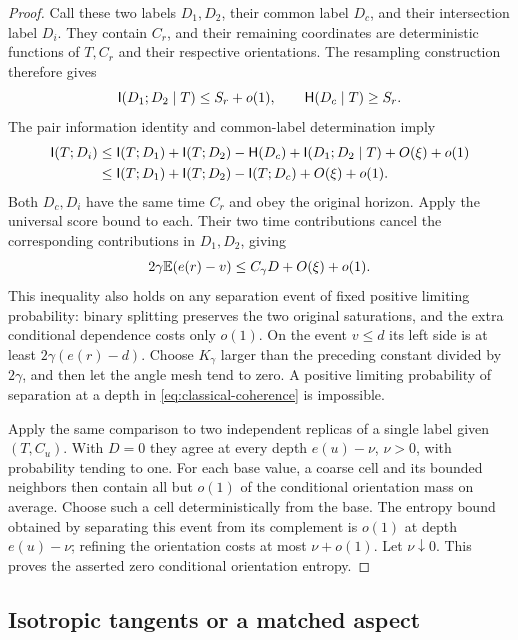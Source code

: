 \begin{proof}
Call these two labels $D_1,D_2$, their common label $D_c$, and their
intersection label $D_i$.  They contain $C_r$, and their remaining
coordinates are deterministic functions of $T,C_r$ and their respective
orientations.  The resampling construction therefore gives
\[
 \mathsf I(D_1;D_2\mid T)\le S_r+o(1),\qquad
 \mathsf H(D_c\mid T)\ge S_r.
\]
The pair information identity and common-label determination imply
\begin{align*}
 \mathsf I(T;D_i)
 &\le\mathsf I(T;D_1)+\mathsf I(T;D_2)-\mathsf H(D_c)
                   +\mathsf I(D_1;D_2\mid T)+O(\xi)+o(1)\\
 &\le\mathsf I(T;D_1)+\mathsf I(T;D_2)-\mathsf I(T;D_c)+O(\xi)+o(1).
\end{align*}
Both $D_c,D_i$ have the same time $C_r$ and obey the original horizon.
Apply the universal score bound to each.  Their two time contributions
cancel the corresponding contributions in $D_1,D_2$, giving
\[
 2\gamma\mathbb E(e(r)-v)\le C_\gamma D+O(\xi)+o(1).
\]
This inequality also holds on any separation event of fixed positive
limiting probability: binary splitting preserves the two original
saturations, and the extra conditional dependence costs only $o(1)$.
On the event $v\le d$ its left side is at least
$2\gamma(e(r)-d)$.  Choose $K_\gamma$ larger than the preceding
constant divided by $2\gamma$, and then let the angle mesh tend to
zero.  A positive limiting probability of separation at a depth in
\eqref{eq:classical-coherence} is impossible.

Apply the same comparison to two independent replicas of a single
label given $(T,C_u)$.  With $D=0$ they agree at every depth
$e(u)-\nu$, $\nu>0$, with probability tending to one.  For each base
value, a coarse cell and its bounded neighbors then contain all but
$o(1)$ of the conditional orientation mass on average.  Choose such a
cell deterministically from the base.  The entropy bound obtained by
separating this event from its complement is $o(1)$ at depth
$e(u)-\nu$; refining the orientation costs at most $\nu+o(1)$.
Let $\nu\downarrow0$.  This proves the asserted zero conditional
orientation entropy.
\end{proof}

\subsection{Isotropic tangents or a matched aspect}

